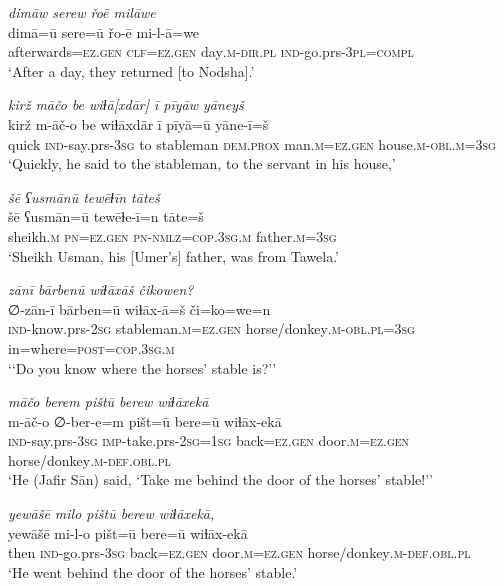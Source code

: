 \ea \label{ŠJ.42}
\textit{dimāw serew řoē milāwe} \\ 
\gll dimā=ū sere=ū řo-ē mi-l-ā=we \\ 
 afterwards\textsc{=ez.gen} \textsc{clf}\textsc{=ez.gen} day\textsc{.m}\textsc{-dir}\textsc{.pl} \textsc{ind-}go.prs\textsc{-3pl}\textsc{=compl} \\ 
\glt `After a day, they returned [to Nodsha].'
\z 
 
\ea \label{ŠJ.51}
\textit{kirž māčo be wiɫā[xdār] ī pīyāw yāneyš} \\ 
\gll kirž m-āč-o be wiɫāxdār ī pīyā=ū yāne-ī=š \\ 
 quick \textsc{ind-}say.prs\textsc{-3sg} to stableman \textsc{dem.prox} man\textsc{.m}\textsc{=ez.gen} house\textsc{.m}\textsc{-obl}\textsc{.m}\textsc{=3sg} \\ 
\glt `Quickly, he said to the stableman, to the servant in his house,'
\z 
 
\ea \label{ŠJ.58}
\textit{šē ʕusmānū tewēɫīn tāteš} \\ 
\gll šē ʕusmān=ū tewēɫe-ī=n tāte=š \\ 
 sheikh\textsc{.m} \textsc{pn}\textsc{=ez.gen} \textsc{pn}\textsc{-nmlz}\textsc{=cop}\textsc{.3sg}\textsc{.m} father\textsc{.m}\textsc{=3sg} \\ 
\glt `Sheikh Usman, his [Umer’s] father, was from Tawela.'
\z 
 
\ea \label{ŠJ.60}
\textit{zānī bārbenū wiɫāxāš čikowen?} \\ 
\gll ∅-zān-ī bārben=ū wiɫāx-ā=š či=ko=we=n \\ 
 \textsc{ind-}know.prs-\textsc{2sg} stableman\textsc{.m}\textsc{=ez.gen} horse/donkey\textsc{.m}\textsc{-obl}\textsc{.pl}\textsc{=3sg} in=where\textsc{=\textsc{post}}\textsc{=cop}\textsc{.3sg}\textsc{.m} \\ 
\glt `‘Do you know where the horses’ stable is?’'
\z 
 
\ea \label{ŠJ.62}
\textit{māčo berem pištū berew wiɫāxekā} \\ 
\gll m-āč-o ∅-ber-e=m pišt=ū bere=ū wiɫāx-ekā \\ 
 \textsc{ind-}say.prs\textsc{-3sg} \textsc{imp-}take.prs-\textsc{2sg}\textsc{=\textsc{1sg}} back\textsc{=ez.gen} door\textsc{.m}\textsc{=ez.gen} horse/donkey\textsc{.m}\textsc{-def}\textsc{.obl}\textsc{.pl} \\ 
\glt `He (Jafir Sān) said, ‘Take me behind the door of the horses’ stable!’'
\z 
 
\ea \label{ŠJ.63}
\textit{yewāšē milo pištū berew wiɫāxekā,} \\ 
\gll yewāšē mi-l-o pišt=ū bere=ū wiɫāx-ekā \\ 
 then \textsc{ind-}go.prs\textsc{-3sg} back\textsc{=ez.gen} door\textsc{.m}\textsc{=ez.gen} horse/donkey\textsc{.m}\textsc{-def}\textsc{.obl}\textsc{.pl} \\ 
\glt `He went behind the door of the horses’ stable.'
\z 
 

